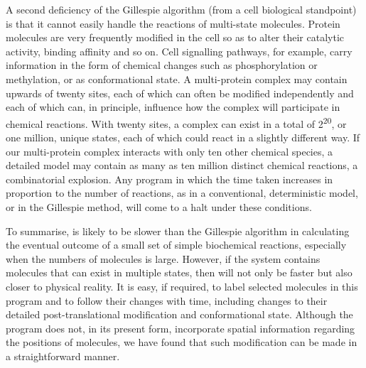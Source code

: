 A second deficiency of the Gillespie algorithm (from a cell biological
standpoint) is that it cannot easily handle the reactions of
multi-state molecules. Protein molecules are very frequently modified
in the cell so as to alter their catalytic activity, binding affinity
and so on. Cell signalling pathways, for example, carry information in
the form of chemical changes such as phosphorylation or methylation,
or as conformational state. A multi-protein complex may contain
upwards of twenty sites, each of which can often be modified
independently and each of which can, in principle, influence how the
complex will participate in chemical reactions. With twenty sites, a
complex can exist in a total of 2\textsuperscript{20}, or one million,
unique states, each of which could react in a slightly different way.
If our multi-protein complex interacts with only ten other chemical
species, a detailed model may contain as many as ten million distinct
chemical reactions,  a combinatorial explosion.  Any program in which
the time taken increases in proportion to the number of reactions, as
in a conventional, deterministic model, or in the Gillespie method,
will come to a halt under these conditions.

To summarise, \stochsim{} is likely to be slower than the Gillespie
algorithm in calculating the eventual outcome of a small set of simple
biochemical reactions, especially when the numbers of molecules is
large. However, if the system contains molecules that can exist in
multiple states, then \stochsim{} will not only be faster but also
closer to physical reality. It is easy, if required, to label selected
molecules in this program and to follow their changes with time,
including changes to their detailed post-translational modification
and conformational state. Although the program does not, in its
present form, incorporate spatial information regarding the positions
of molecules, we have found that such modification can be made in a
straightforward manner.
